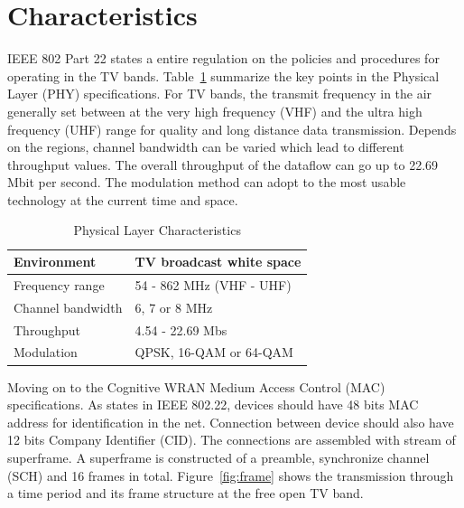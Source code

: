 \section{Characteristics}
IEEE 802 Part 22 states a entire regulation on the policies and procedures for operating in the TV bands. 
Table~\ref{tab:physical} summarize the key points in the Physical Layer (PHY) specifications. For TV bands, 
the transmit frequency in the air generally set between at the very high frequency (VHF) and the ultra high frequency (UHF) range
for quality and long distance data transmission. Depends on the regions, channel bandwidth can be varied which lead to
different throughput values. The overall throughput of the dataflow can go up to 22.69 Mbit per second.
The modulation method can adopt to the most usable technology at the current time and space. 

\begin{table}[ht]
\centering
\setlength{\tabcolsep}{20pt}
\renewcommand{\arraystretch}{1.5}
\begin{tabular}{| l | l |}
\hline
\hspace{0.3cm}  Environment & TV broadcast white space \\ 
\hline
\hspace{0.3cm}  Frequency range &  54 - 862 MHz  (VHF - UHF)\\ 
\hline
\hspace{0.3cm}  Channel bandwidth &  6, 7 or 8 MHz \\ 
\hline
\hspace{0.3cm}  Throughput &  4.54 - 22.69 Mbs  \\ 
\hline
\hspace{0.3cm}  Modulation &  QPSK, 16-QAM or 64-QAM  \\ 
\hline
\end{tabular}
\caption{Physical Layer Characteristics}
\label{tab:physical}
\end{table}

Moving on to the Cognitive WRAN Medium Access Control (MAC) specifications. As states in IEEE 802.22, devices should have 48
bits MAC address for identification in the net. Connection between device should also have 12 bits Company Identifier (CID). The 
connections are assembled with stream of superframe. A superframe is constructed of a preamble, synchronize channel (SCH) and 16 frames
in total. Figure~\ref{fig:frame} shows the transmission through a time period and its frame structure at the free open TV band. 

